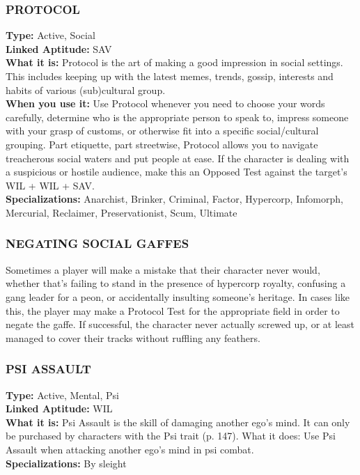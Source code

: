\subsubsection{PROTOCOL}
\textbf{Type:} Active, Social
\\ \textbf{Linked Aptitude:} SAV
\\ \textbf{What it is:} Protocol is the art of making a good
impression in social settings. This includes keeping
up with the latest memes, trends, gossip, interests and
habits of various (sub)cultural group.
\\ \textbf{When you use it:} Use Protocol whenever you need
to choose your words carefully, determine who is the
appropriate person to speak to, impress someone with
your grasp of customs, or otherwise fit into a specific
social/cultural grouping. Part etiquette, part streetwise,
Protocol allows you to navigate treacherous social
waters and put people at ease. If the character is dealing with a suspicious or hostile audience, make this an
Opposed Test against the target’s WIL + WIL + SAV.
\\ \textbf{Specializations:} Anarchist, Brinker, Criminal, Factor,
Hypercorp, Infomorph, Mercurial, Reclaimer, Preservationist, Scum, Ultimate

\subsubsection{NEGATING SOCIAL GAFFES}
Sometimes a player will make a mistake that their
character never would, whether that’s failing to stand
in the presence of hypercorp royalty, confusing a gang
leader for a peon, or accidentally insulting someone’s
heritage. In cases like this, the player may make a Protocol Test for the appropriate field in order to negate
the gaffe. If successful, the character never actually
screwed up, or at least managed to cover their tracks
without ruffling any feathers.

\subsubsection{PSI ASSAULT}
\textbf{Type:} Active, Mental, Psi
\\ \textbf{Linked Aptitude:} WIL
\\ \textbf{What it is:} Psi Assault is the skill of damaging another ego’s mind. It can only be purchased by characters with the Psi trait (p. 147).
What it does: Use Psi Assault when attacking another ego’s mind in psi combat.
\\ \textbf{Specializations:} By sleight


